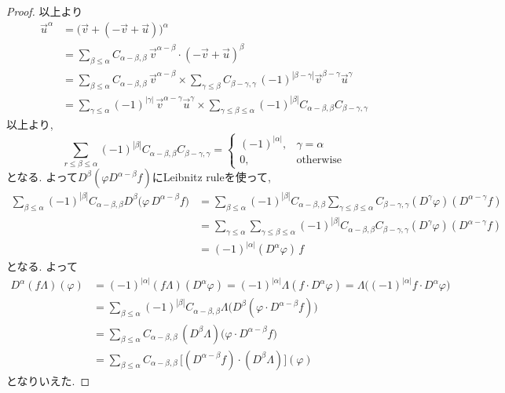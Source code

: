 \documentclass[dvipdfmx,a4paper,11pt]{article} %
\theoremstyle{definition}
\theoremstyle{remark}
\numberwithin{equation}{section}
\begin{document}
\begin{proof}
以上より
\begin{align*}
\vec{u}^{\alpha}
&= \bigl(\vec{v} + (-\vec{v} + \vec{u})\bigr)^{\alpha} \\[6pt]
&= \sum_{\beta \leq \alpha} C_{\alpha-\beta,\beta}\,
   \vec{v}^{\alpha-\beta} \cdot (-\vec{v} + \vec{u})^{\beta} \\[6pt]
&= \sum_{\beta \leq \alpha} C_{\alpha-\beta,\beta}\,
   \vec{v}^{\alpha-\beta} \times
   \sum_{\gamma \leq \beta} C_{\beta-\gamma,\gamma}\,
   (-1)^{|\beta-\gamma|}\vec{v}^{\beta-\gamma}\vec{u}^{\gamma} \\[6pt]
&= \sum_{\gamma \leq \alpha} (-1)^{|\gamma|}\,
   \vec{v}^{\alpha-\gamma}\vec{u}^{\gamma}
   \times \sum_{\gamma \leq \beta \leq \alpha}
   (-1)^{|\beta|} C_{\alpha-\beta,\beta} C_{\beta-\gamma,\gamma}
\end{align*}
以上より, 
\[
 \sum_{r \le \beta \le \alpha} (-1)^{|\beta|} C_{\alpha-\beta,\beta} C_{\beta-\gamma,\gamma} = 
\begin{cases}
(-1)^{|\alpha|}, & \gamma = \alpha \\
0, & \text{otherwise}
\end{cases}
\]
となる.
よって\(D^\beta \left( \varphi D^{\alpha-\beta} f \right)\)にLeibnitz ruleを使って, 
\begin{align*}
\sum_{\beta \le \alpha} 
  (-1)^{|\beta|} C_{\alpha-\beta,\beta} D^\beta \bigl(\varphi \, D^{\alpha-\beta} f \bigr)
&= \sum_{\beta \le \alpha} 
   (-1)^{|\beta|} C_{\alpha-\beta,\beta} 
   \sum_{\gamma \le \beta \le \alpha} 
   C_{\beta-\gamma, \gamma} (D^\gamma \varphi) (D^{\alpha-\gamma} f) \\[6pt]
&= \sum_{\gamma \le \alpha}  
   \sum_{\gamma \le \beta \le \alpha} 
   (-1)^{|\beta|}C_{\alpha-\beta,\beta} C_{\beta-\gamma, \gamma} 
   (D^\gamma \varphi) (D^{\alpha-\gamma} f) \\[6pt]
&= (-1)^{|\alpha|} (D^\alpha \varphi)\, f
\end{align*}
となる. よって
\begin{align*}
D^\alpha(f\Lambda)(\varphi)
&= (-1)^{|\alpha|} (f\Lambda)(D^\alpha \varphi) = (-1)^{|\alpha|} \Lambda(f \cdot D^\alpha \varphi) = \Lambda\big( (-1)^{|\alpha|} f \cdot D^\alpha \varphi \big) \\[6pt]
&= \sum_{\beta \le \alpha} 
   (-1)^{|\beta|} C_{\alpha-\beta,\beta}
   \Lambda\big( D^\beta(\varphi \cdot D^{\alpha-\beta} f) \big) \\[6pt]
&= \sum_{\beta \le \alpha} 
   C_{\alpha-\beta,\beta} \, (D^\beta \Lambda)\big( \varphi \cdot D^{\alpha-\beta} f \big) \\[6pt]
&= \sum_{\beta \le \alpha} 
   C_{\alpha-\beta,\beta} \, \big[ (D^{\alpha-\beta} f) \cdot (D^\beta \Lambda) \big](\varphi)
\end{align*}
となりいえた. 
\end{proof}
\end{document}

